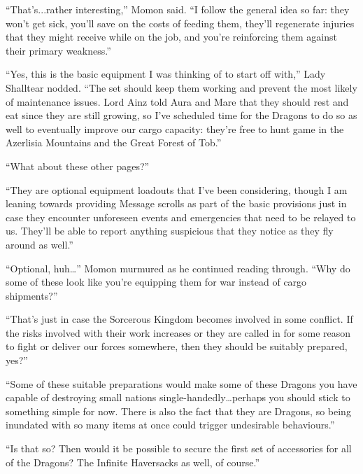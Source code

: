  

“That’s...rather interesting,” Momon said. “I follow the general idea so far: they won’t get sick, you’ll save on the costs of feeding them, they’ll regenerate injuries that they might receive while on the job, and you’re reinforcing them against their primary weakness.”

 

“Yes, this is the basic equipment I was thinking of to start off with,” Lady Shalltear nodded. “The set should keep them working and prevent the most likely of maintenance issues. Lord Ainz told Aura and Mare that they should rest and eat since they are still growing, so I’ve scheduled time for the Dragons to do so as well to eventually improve our cargo capacity: they’re free to hunt game in the Azerlisia Mountains and the Great Forest of Tob.”

 

“What about these other pages?”

 

“They are optional equipment loadouts that I’ve been considering, though I am leaning towards providing Message scrolls as part of the basic provisions just in case they encounter unforeseen events and emergencies that need to be relayed to us. They’ll be able to report anything suspicious that they notice as they fly around as well.”

 

“Optional, huh…” Momon murmured as he continued reading through. “Why do some of these look like you’re equipping them for war instead of cargo shipments?”

 

“That’s just in case the Sorcerous Kingdom becomes involved in some conflict. If the risks involved with their work increases or they are called in for some reason to fight or deliver our forces somewhere, then they should be suitably prepared, yes?”

 

“Some of these suitable preparations would make some of these Dragons you have capable of destroying small nations single-handedly…perhaps you should stick to something simple for now. There is also the fact that they are Dragons, so being inundated with so many items at once could trigger undesirable behaviours.”

 

“Is that so? Then would it be possible to secure the first set of accessories for all of the Dragons? The Infinite Haversacks as well, of course.”

